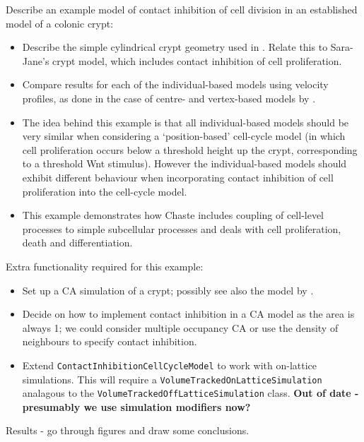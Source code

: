 \documentclass{article}
\newcommand{\highlight}[1]{{\color{red} \bf{#1}}}
\begin{document}
\noindent Describe an example model of contact inhibition of cell division in an established model of a colonic crypt:
\begin{itemize}
\item Describe the simple cylindrical crypt geometry used in \citet{vanLeeuwen2009Integrative, Osborne2010Hybrid, Mirams2012Theoretical}. Relate this to Sara-Jane's crypt model, which includes contact inhibition of cell proliferation.
\item Compare results for each of the individual-based models using velocity profiles, as done in the case of centre- and vertex-based models by \citet{Osborne2010Hybrid}.
\item The idea behind this example is that all individual-based models should be very similar when considering a `position-based' cell-cycle model (in which cell proliferation occurs below a threshold height up the crypt, corresponding to a threshold Wnt stimulus). However the individual-based models should exhibit different behaviour when incorporating contact inhibition of cell proliferation into the cell-cycle model.
\item This example demonstrates how Chaste includes coupling of cell-level processes to simple subcellular processes and deals with cell proliferation, death and differentiation.
\end{itemize}

\noindent Extra functionality required for this example:
\begin{itemize}
\item Set up a CA simulation of a crypt; possibly see also the model by \citet{Paulus1992Model}. 
\item Decide on how to implement contact inhibition in a CA model as the area is always 1; we could consider multiple occupancy CA or use the density of neighbours to specify contact inhibition.
\item Extend \texttt{ContactInhibitionCellCycleModel} to work with on-lattice simulations. This will require a \texttt{VolumeTrackedOnLatticeSimulation} analagous to the \texttt{VolumeTrackedOffLatticeSimulation} class. 
\highlight{Out of date - presumably we use simulation modifiers now?}
\end{itemize}

\noindent Results - go through figures and draw some conclusions.
\end{document}
